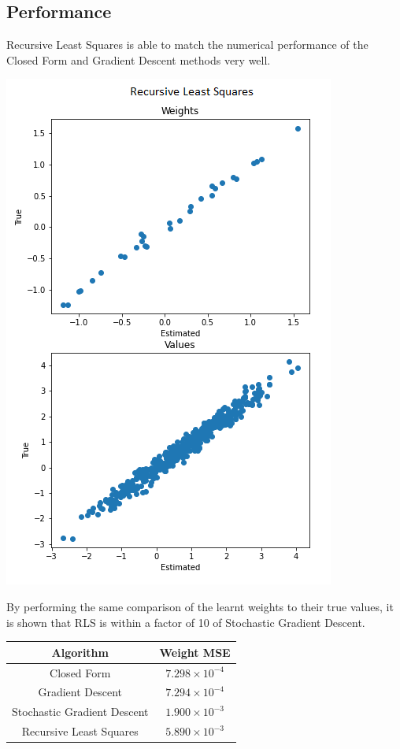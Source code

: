 \subsection{Performance}
Recursive Least Squares is able to match the numerical performance of the Closed Form and Gradient Descent methods very well.
\begin{center}
    \includegraphics[scale= 0.4]{figs/RLS Weights.png}
\end{center}
By performing the same comparison of the learnt weights to their true values, it is shown that RLS is within a factor of 10 of Stochastic Gradient Descent.
\begin{center}
    \begin{tabular}{| c c |}
        \hline
        Algorithm & Weight MSE \\ 
        \hline\hline
        Closed Form & $7.298 \times 10^{-4}$\\ 
        Gradient Descent & $7.294 \times 10^{-4}$ \\
        Stochastic Gradient Descent & $1.900 \times 10^{-3}$\\
        Recursive Least Squares & $5.890 \times 10^{-3}$\\
        \hline      
    \end{tabular}
\end{center}
